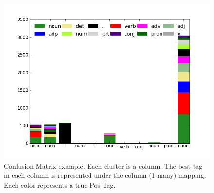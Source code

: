 \begin{figure}
\centering
\includegraphics[scale=.5]{figs/sequences/cm_uns1.png}
\caption{\label{fig:cm_uns} Confusion Matrix example. Each cluster is a column. The best tag in each column is represented under the column (1-many) mapping. Each color represents a true Pos Tag.}
\end{figure}


